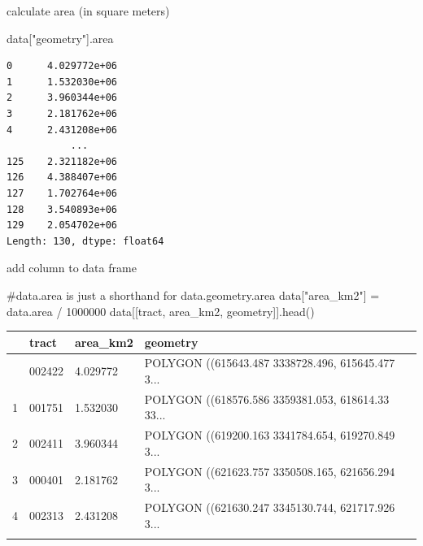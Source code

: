 \documentclass[
  ignorenonframetext,
]{beamer}
\newenvironment{Shaded}{\begin{snugshade}}{\end{snugshade}}
\newcommand{\CommentTok}[1]{\textcolor[rgb]{0.37,0.37,0.37}{#1}}
\newcommand{\DecValTok}[1]{\textcolor[rgb]{0.68,0.00,0.00}{#1}}
\newcommand{\NormalTok}[1]{\textcolor[rgb]{0.00,0.23,0.31}{#1}}
\newcommand{\OperatorTok}[1]{\textcolor[rgb]{0.37,0.37,0.37}{#1}}
\newcommand{\StringTok}[1]{\textcolor[rgb]{0.13,0.47,0.30}{#1}}
\begin{document}
\begin{frame}[fragile]{calculate area (in square meters)}
\label{calculate-area-in-square-meters}
\begin{Shaded}
\begin{Highlighting}[]
\NormalTok{data[}\StringTok{"geometry"}\NormalTok{].area}
\end{Highlighting}
\end{Shaded}

\begin{verbatim}
0      4.029772e+06
1      1.532030e+06
2      3.960344e+06
3      2.181762e+06
4      2.431208e+06
           ...     
125    2.321182e+06
126    4.388407e+06
127    1.702764e+06
128    3.540893e+06
129    2.054702e+06
Length: 130, dtype: float64
\end{verbatim}
\end{frame}

\begin{frame}[fragile]{add column to data frame}
\label{add-column-to-data-frame}
\scriptsize

\begin{Shaded}
\begin{Highlighting}[]
\CommentTok{\#data.area is just a shorthand for data.geometry.area}
\NormalTok{data[}\StringTok{"area\_km2"}\NormalTok{] }\OperatorTok{=}\NormalTok{ data.area }\OperatorTok{/} \DecValTok{1000000}
\NormalTok{data[[}\StringTok{\textquotesingle{}tract\textquotesingle{}}\NormalTok{, }\StringTok{\textquotesingle{}area\_km2\textquotesingle{}}\NormalTok{, }\StringTok{\textquotesingle{}geometry\textquotesingle{}}\NormalTok{]].head()}
\end{Highlighting}
\end{Shaded}

\begin{longtable}[]{@{}llll@{}}
\toprule\noalign{}
& tract & area\_km2 & geometry \\
\midrule\noalign{}
\endhead
0 & 002422 & 4.029772 & POLYGON ((615643.487 3338728.496, 615645.477
3... \\
1 & 001751 & 1.532030 & POLYGON ((618576.586 3359381.053, 618614.33
33... \\
2 & 002411 & 3.960344 & POLYGON ((619200.163 3341784.654, 619270.849
3... \\
3 & 000401 & 2.181762 & POLYGON ((621623.757 3350508.165, 621656.294
3... \\
4 & 002313 & 2.431208 & POLYGON ((621630.247 3345130.744, 621717.926
3... \\
\bottomrule\noalign{}
\end{longtable}

\normalsize
\end{frame}
\end{document}

